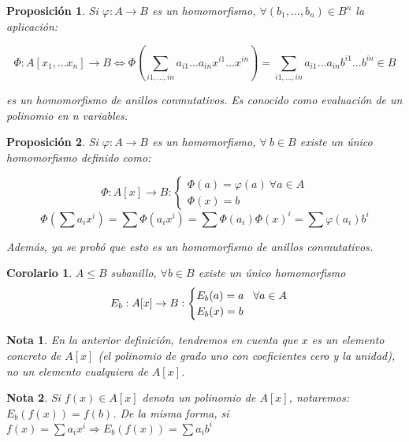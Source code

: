 \documentclass[11pt, a4paper, titlepage]{article}
\newif\IfInSansMode
\theoremstyle{theorem-style}
\newtheorem{nprop}{Proposición}[section]
\newtheorem{ncor}{Corolario}[section]
\theoremstyle{definition-style}
\theoremstyle{remark-style}
\newtheorem*{nota}{Nota}
\theoremstyle{example-style}
\begin{document}
\begin{nprop}

Si $\varphi :A \to B$ es un homomorfismo, $\forall(b_1,...,b_n) \in B^n$ la aplicación:

\[
\Phi:A[x_1,...x_n] \to B \iff \Phi\left(\sum_{i1,...,in}a_{i1}...a_{in}x^{i1}... x^{in}\right) = \sum_{i1,...,in}a_{i1}...a_{in}b^{i1}... b^{in} \in B
\]

es un homomorfismo de anillos conmutativos. Es conocido como evaluación de un polinomio en n variables.

\end{nprop}



\begin{nprop}
	Si $\varphi:A \to B$ es un homomorfismo, $\forall\  b \in B$ existe un único homomorfismo definido como:

\[
\Phi:A[x] \to B : \begin{cases}
	\Phi(a) = \varphi(a)\ \forall a \in A \\
	\Phi(x) = b
\end{cases}
\]
\[
\Phi\left(\sum a_i x^i\right) = \sum \Phi(a_i x^i) =  \sum \Phi(a_i) \Phi(x)^i = \sum \varphi(a_i) b^i
\]

Además, ya se probó que esto es un homomorfismo de anillos conmutativos.

\end{nprop}

\begin{ncor}
	$A \leq B$ subanillo, $\forall b \in B$ existe un único homomorfismo
\[
E_b: A[x] \to B: \begin{cases}
E_b(a) = a \hspace{0.3cm} \forall a \in A\\
E_b(x) = b

\end{cases}
\]
\end{ncor}

\begin{nota}
	En la anterior definición, tendremos en cuenta que $x$ es un elemento concreto de $A[x]$ (el polinomio de grado uno con coeficientes cero y la unidad), no un elemento cualquiera de $A[x]$.
\end{nota}

\begin{nota}
	Si $f(x)\in A[x]$ denota un polinomio de $A[x]$, notaremos: $E_b(f(x)) = f(b)$.
	De la misma forma, si $f(x) = \sum a_i x^i \Rightarrow E_b(f(x)) = \sum a_i b^i$
\end{nota}
\end{document}
